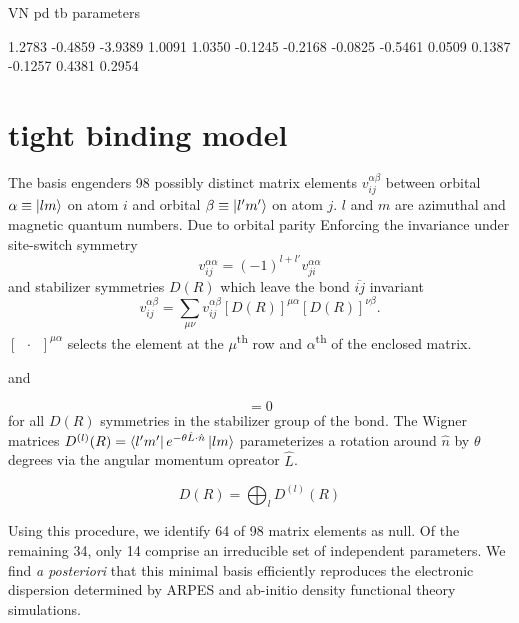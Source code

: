 \documentclass[preprint,showpacs,preprintnumbers,superscriptaddress,prb,floatfix,aps]{revtex4-1}
\newcommand*{\wignerD}{D(R)}
\newcommand*{\wignerDl}{D^{(l)}(R)}
\begin{document}


\clearpage

VN pd tb parameters

    1.2783
   -0.4859
   -3.9389
    1.0091
    1.0350
   -0.1245
   -0.2168
   -0.0825
   -0.5461
    0.0509
    0.1387
   -0.1257
    0.4381
    0.2954




\appendix


\section{tight binding model}\label{appendix:tb}

The basis engenders 98 possibly distinct matrix elements $v_{ij}^{\alpha\beta}$ between orbital $\alpha \equiv \ket{lm}$ on atom $i$ and orbital $\beta \equiv \ket{l'm'}$ on atom $j$. $l$ and $m$ are azimuthal and magnetic quantum numbers. Due to orbital parity Enforcing the invariance under site-switch symmetry
\begin{equation}
v_{ij}^{\alpha\alpha} = (-1)^{l+l'}v_{ji}^{\alpha\alpha}
\end{equation}
and stabilizer symmetries $D\left(R\right)$ which leave the bond $\overline{ij}$ invariant
\begin{equation}
v_{ij}^{\alpha\beta} = \sum_{\mu\nu} v_{ij}^{\alpha\beta} \left[\wignerD\right]^{\mu\alpha} \left[\wignerD\right]^{\nu\beta}.
\end{equation}
$\left[\phantom{a}\cdot\phantom{a}\right] ^{\mu\alpha}$ selects the element at the $\mu$\textsuperscript{th} row and $\alpha$\textsuperscript{th} of the enclosed matrix.


and 


\begin{equation}
[V,D(R)] = 0
\end{equation}
for all $D(R)$ symmetries in the stabilizer group of the bond. The Wigner matrices $\wignerDl =  \bra{l'm'} e^{-\theta\hat{L}\cdot\hat{n}}\ket{lm}$ parameterizes a rotation around $\hat{n}$ by $\theta$ degrees via the angular momentum opreator $\hat{L}$. %



\begin{equation}
D(R) = \bigoplus_l D^{(l)}(R)
\end{equation}

Using this procedure, we identify 64 of 98 matrix elements as null. Of the remaining 34, only 14 comprise an irreducible set of independent parameters. We find \emph{a posteriori} that this minimal basis efficiently reproduces the electronic dispersion determined by ARPES and ab-initio density functional theory simulations.
\end{document}
